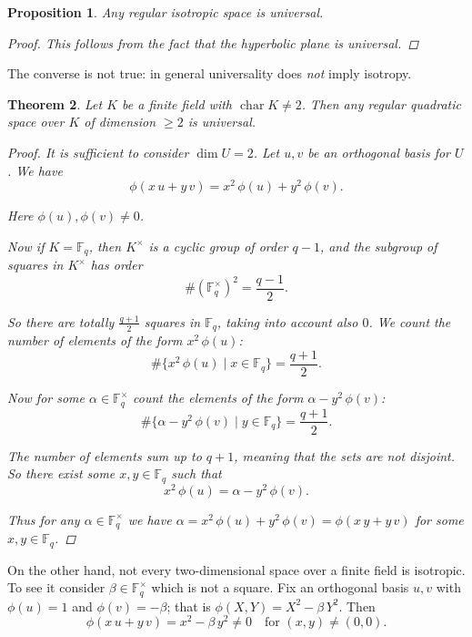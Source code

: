\documentclass{article}
\newcommand{\FF}{\mathbb{F}}
\DeclareMathOperator{\fchar}{char}
\theoremstyle{myplain}
\newtheorem{proposition}{Proposition}[section]
\newtheorem{theorem}[proposition]{Theorem}
\theoremstyle{mydefinition}
\begin{document}
\begin{proposition}
  Any regular isotropic space is universal.

  \begin{proof}
    This follows from the fact that the hyperbolic plane is universal.
  \end{proof}
\end{proposition}

The converse is not true: in general universality does \emph{not} imply
isotropy.

\begin{theorem}
  Let $K$ be a finite field with $\fchar K \ne 2$. Then any regular quadratic
  space over $K$ of dimension $\ge 2$ is universal.

  \begin{proof}
    It is sufficient to consider $\dim U = 2$. Let $u,v$ be an orthogonal basis
    for $U$. We have
    \[ \phi (x\,u + y\,v) = x^2 \, \phi (u) + y^2 \, \phi (v). \]

    Here $\phi (u), \phi (v) \ne 0$.

    Now if $K = \FF_q$, then $K^\times$ is a cyclic group of order $q-1$, and
    the subgroup of squares in $K^\times$ has order
    \[ \# (\FF_q^\times)^2 = \frac{q-1}{2}. \]

    So there are totally $\frac{q+1}{2}$ squares in $\FF_q$, taking into account
    also $0$. We count the number of elements of the form $x^2 \, \phi (u)$:
    \[ \# \{ x^2 \, \phi (u) \mid x\in \FF_q \} = \frac{q+1}{2}. \]

    Now for some $\alpha \in \FF_q^\times$ count the elements of the form
    $\alpha - y^2 \, \phi (v)$:
    \[ \# \{ \alpha - y^2 \, \phi (v) \mid y \in \FF_q \} = \frac{q+1}{2}. \]

    The number of elements sum up to $q+1$, meaning that the sets are not
    disjoint. So there exist some $x, y\in \FF_q$ such that
    \[ x^2 \, \phi (u) = \alpha - y^2 \, \phi (v). \]

    Thus for any $\alpha \in \FF_q^\times$ we have
    $\alpha = x^2 \, \phi (u) + y^2 \, \phi (v) = \phi (x\,y + y\,v)$ for some
    $x,y \in \FF_q$.
  \end{proof}
\end{theorem}

On the other hand, not every two-dimensional space over a finite field is
isotropic. To see it consider $\beta \in \FF_q^\times$ which is not a
square. Fix an orthogonal basis $u,v$ with $\phi (u) = 1$ and
$\phi (v) = -\beta$; that is $\phi (X,Y) = X^2 - \beta\,Y^2$. Then
\[ \phi (x\,u + y\,v) = x^2 - \beta \, y^2 \ne 0 \quad \text{for } (x,y) \ne (0,0). \]
\end{document}
